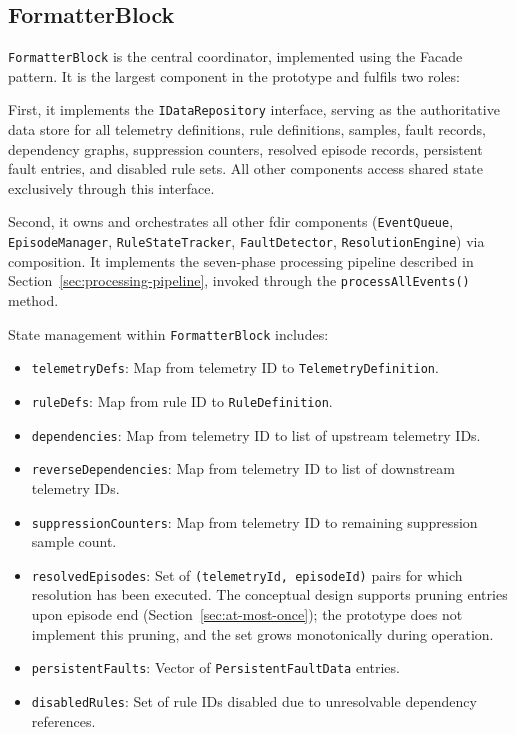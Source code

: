 \subsection{FormatterBlock}

\texttt{FormatterBlock} is the central coordinator, implemented using the Facade pattern. It is the largest component in the prototype and fulfils two roles:

First, it implements the \texttt{IDataRepository} interface, serving as the authoritative data store for all telemetry definitions, rule definitions, samples, fault records, dependency graphs, suppression counters, resolved episode records, persistent fault entries, and disabled rule sets. All other components access shared state exclusively through this interface.

Second, it owns and orchestrates all other \gls{fdir} components (\texttt{EventQueue}, \texttt{EpisodeManager}, \texttt{RuleStateTracker}, \texttt{FaultDetector}, \texttt{ResolutionEngine}) via composition. It implements the seven-phase processing pipeline described in Section~\ref{sec:processing-pipeline}, invoked through the \texttt{processAllEvents()} method.

State management within \texttt{FormatterBlock} includes:

\begin{itemize}
\item \texttt{telemetryDefs}: Map from telemetry ID to \texttt{TelemetryDefinition}.
\item \texttt{ruleDefs}: Map from rule ID to \texttt{RuleDefinition}.
\item \texttt{dependencies}: Map from telemetry ID to list of upstream telemetry IDs.
\item \texttt{reverseDependencies}: Map from telemetry ID to list of downstream telemetry IDs.
\item \texttt{suppressionCounters}: Map from telemetry ID to remaining suppression sample count.
\item \texttt{resolvedEpisodes}: Set of \texttt{(telemetryId, episodeId)} pairs for which resolution has been executed. The conceptual design supports pruning entries upon episode end (Section~\ref{sec:at-most-once}); the prototype does not implement this pruning, and the set grows monotonically during operation.
\item \texttt{persistentFaults}: Vector of \texttt{PersistentFaultData} entries.
\item \texttt{disabledRules}: Set of rule IDs disabled due to unresolvable dependency references.
\end{itemize}

